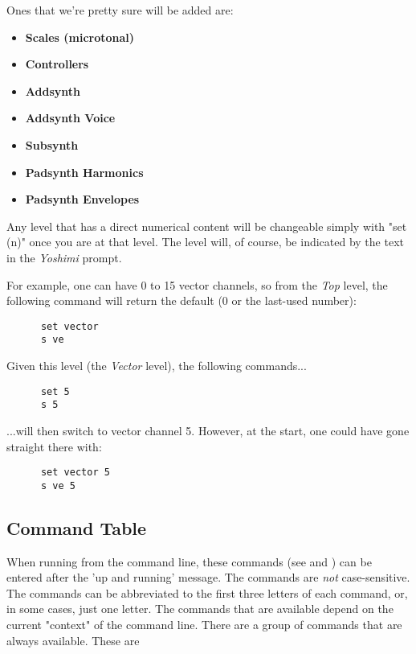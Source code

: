 Ones that we're pretty sure will be added are:

   \begin{itemize}
      \item \textbf{Scales (microtonal)}
      \item \textbf{Controllers}
      \item \textbf{Addsynth}
      \item \textbf{Addsynth Voice}
      \item \textbf{Subsynth}
      \item \textbf{Padsynth Harmonics}
      \item \textbf{Padsynth Envelopes}
   \end{itemize}

   Any level that has a direct numerical content will be changeable simply with
   "set (n)" once you are at that level.  The level will, of course, be
   indicated by the text in the \textsl{Yoshimi} prompt.

   For example, one can have 0 to 15 vector channels, so from the
   \textsl{Top} level, the following command
   will return the default  (0 or the last-used number):

   \begin{verbatim}
      set vector
      s ve
   \end{verbatim}

   Given this level (the \textsl{Vector} level), the following commands...

   \begin{verbatim}
      set 5 
      s 5
   \end{verbatim}

   ...will then switch to vector channel 5.
   However, at the start, one could have gone straight there with:

   \begin{verbatim}
      set vector 5
      s ve 5
   \end{verbatim}

\subsection{Command Table}
\label{subsec:command_line_command_table}

   When running from the command line, these commands
   (see 
   and )
   can be entered after the 'up and running' message.
   The commands are \textsl{not} case-sensitive.
   The commands can be abbreviated to the first three letters of each command,
   or, in some cases, just one letter.
   The commands that are available depend on the current "context" of the
   command line.
   There are a group of commands that are always available. These are


